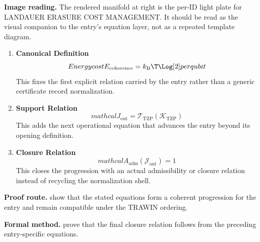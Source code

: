 \begin{samepage}
\noindent\begin{minipage}[t]{0.45\linewidth}
\vspace{0pt}
\raggedright
\scriptsize\textbf{Image reading.} The rendered manifold at right is the per-ID light plate for LANDAUER ERASURE COST MANAGEMENT. It should be read as the visual companion to the entry's equation layer, not as a repeated template diagram.\par
\end{minipage}\hfill
\begin{minipage}[t]{0.53\linewidth}
\vspace*{-0.10in}
\raggedright
{}
\end{minipage}
\end{samepage}

\clearpage


\begin{enumerate}[leftmargin=1.6em,itemsep=9pt,topsep=6pt]
\item \textbf{Canonical Definition}
\[
Energy cost E_{\mathrm{coherence}} = k_{\mathrm{B}} \T \Log[2] per qubit
\]
This fixes the first explicit relation carried by the entry rather than a generic certificate record normalization.

\item \textbf{Support Relation}
\[
mathcal{J}_{\mathrm{out}} = \mathcal{T}_{\mathrm{TZP}}\!\left(\mathcal{K}_{\mathrm{TZP}}\right)
\]
This adds the next operational equation that advances the entry beyond its opening definition.

\item \textbf{Closure Relation}
\[
mathcal{A}_{\mathrm{adm}}\!\left(\mathcal{J}_{\mathrm{out}}\right)=1
\]
This closes the progression with an actual admissibility or closure relation instead of recycling the normalization shell.
\end{enumerate}

\textbf{Proof route.} show that the stated equations form a coherent progression for the entry and remain compatible under the TRAWIN ordering.

\textbf{Formal method.} prove that the final closure relation follows from the preceding entry-specific equations.

\medskip
{}

